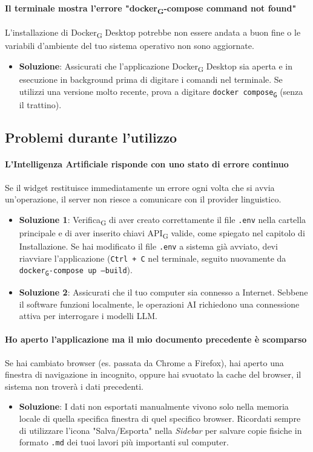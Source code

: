 \documentclass[11pt,a4paper]{article}
\newcommand{\gls}[1]{#1\textsubscript{G}}
\begin{document}
\paragraph{Il terminale mostra l'errore "\gls{docker}-compose command not found"}
L'installazione di \gls{Docker} Desktop potrebbe non essere andata a buon fine o le variabili d'ambiente del tuo sistema operativo non sono aggiornate.
\begin{itemize}
    \item \textbf{Soluzione}: Assicurati che l'applicazione \gls{Docker} Desktop sia aperta e in esecuzione in background prima di digitare i comandi nel terminale. Se utilizzi una versione molto recente, prova a digitare \texttt{\gls{docker compose}} (senza il trattino).
\end{itemize}

\subsection{Problemi durante l'utilizzo}

\paragraph{L'Intelligenza Artificiale risponde con uno stato di errore continuo}
Se il widget restituisce immediatamente un errore ogni volta che si avvia un'operazione, il server non riesce a comunicare con il provider linguistico.
\begin{itemize}
    \item \textbf{Soluzione 1}: \gls{Verifica} di aver creato correttamente il file \texttt{.env} nella cartella principale e di aver inserito chiavi \gls{API} valide, come spiegato nel capitolo di Installazione. Se hai modificato il file \texttt{.env} a sistema già avviato, devi riavviare l'applicazione (\texttt{Ctrl + C} nel terminale, seguito nuovamente da \texttt{\gls{docker}-compose up --build}).
    \item \textbf{Soluzione 2}: Assicurati che il tuo computer sia connesso a Internet. Sebbene il software funzioni localmente, le operazioni AI richiedono una connessione attiva per interrogare i modelli LLM.
\end{itemize}

\paragraph{Ho aperto l'applicazione ma il mio documento precedente è scomparso}
Se hai cambiato browser (es. passata da Chrome a Firefox), hai aperto una finestra di navigazione in incognito, oppure hai svuotato la cache del browser, il sistema non troverà i dati precedenti.
\begin{itemize}
    \item \textbf{Soluzione}: I dati non esportati manualmente vivono solo nella memoria locale di quella specifica finestra di quel specifico browser. Ricordati sempre di utilizzare l'icona "Salva/Esporta" nella \textit{Sidebar} per salvare copie fisiche in formato \texttt{.md} dei tuoi lavori più importanti sul computer.
\end{itemize}
\end{document}
